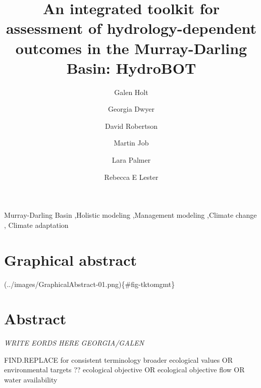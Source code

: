 \documentclass[
  number]{elsarticle}
\begin{document}
\begin{frontmatter}
\title{An integrated toolkit for assessment of hydrology-dependent
outcomes in the Murray-Darling Basin: HydroBOT}
\author[3]{Galen Holt%
%
}
\author[3]{Georgia Dwyer%
%
}

\author[1]{David Robertson%
%
}

\author[2]{Martin Job%
%
}

\author[2]{Lara Palmer%
%
}

\author[3]{Rebecca E Lester%
%
}









        





\begin{keyword}
    Murray-Darling Basin \sep Holistic modeling \sep Management
modeling \sep Climate change \sep 
    Climate adaptation
\end{keyword}
\end{frontmatter}
    \ifdefined\Shaded\renewenvironment{Shaded}{\begin{tcolorbox}[sharp corners, breakable, enhanced, boxrule=0pt, borderline west={3pt}{0pt}{shadecolor}, interior hidden, frame hidden]}{\end{tcolorbox}}\fi

\hypertarget{graphical-abstract}{%
\section{Graphical abstract}\label{graphical-abstract}}

(../images/GraphicalAbstract-01.png)\{\#fig-tktomgmt\}

\hypertarget{abstract}{%
\section{Abstract}\label{abstract}}

\emph{WRITE EORDS HERE GEORGIA/GALEN}

FIND.REPLACE for consistent terminology broader ecological values OR
environmental targets ?? ecological objective OR ecological objective
flow OR water availability
\end{document}
